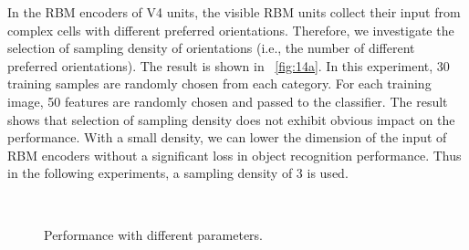 \documentclass[twocolumn]{article}
\begin{document}
In the RBM encoders of V4 units, the visible RBM units collect their input from complex cells with different preferred orientations.
Therefore, we investigate the selection of sampling density of orientations (i.e., the number of different preferred orientations).
The result is shown in \figurename~\ref{fig:14a}.
In this experiment, 30 training samples are randomly chosen from each category.
For each training image, 50 features are randomly chosen and passed to the classifier.
The result shows that selection of sampling density does not exhibit obvious impact on the performance.
With a small density, we can lower the dimension of the input of RBM encoders without a significant loss in object recognition performance.
Thus in the following experiments, a sampling density of $3$ is used. 

\begin{figure}[!t]
\centering
  \\
\caption{Performance with different parameters.}
\label{fig:14}
\end{figure}
\end{document}
